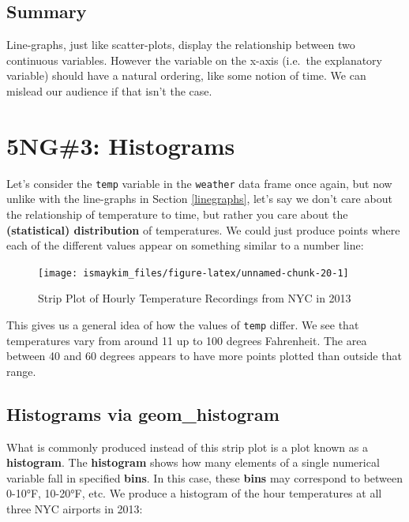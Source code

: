 \documentclass[]{tufte-book}
\begin{document}
\subsection{Summary}\label{summary-1}

Line-graphs, just like scatter-plots, display the relationship between
two continuous variables. However the variable on the x-axis (i.e.~the
explanatory variable) should have a natural ordering, like some notion
of time. We can mislead our audience if that isn't the case.

\section{5NG\#3: Histograms}\label{histograms}

Let's consider the \texttt{temp} variable in the \texttt{weather} data
frame once again, but now unlike with the line-graphs in Section
\ref{linegraphs}, let's say we don't care about the relationship of
temperature to time, but rather you care about the \textbf{(statistical)
distribution} of temperatures. We could just produce points where each
of the different values appear on something similar to a number line:

\begin{figure}

{\centering \texttt{[image: ismaykim\_files/figure-latex/unnamed-chunk-20-1]} 

}

\caption[Strip Plot of Hourly Temperature Recordings from NYC in 2013]{Strip Plot of Hourly Temperature Recordings from NYC in 2013}\label{fig:unnamed-chunk-20}
\end{figure}

This gives us a general idea of how the values of \texttt{temp} differ.
We see that temperatures vary from around 11 up to 100 degrees
Fahrenheit. The area between 40 and 60 degrees appears to have more
points plotted than outside that range.

\subsection{Histograms via geom\_histogram}\label{geomhistogram}

What is commonly produced instead of this strip plot is a plot known as
a \textbf{histogram}. The \textbf{histogram} shows how many elements of
a single numerical variable fall in specified \textbf{bins}. In this
case, these \textbf{bins} may correspond to between 0-10°F, 10-20°F,
etc. We produce a histogram of the hour temperatures at all three NYC
airports in 2013:
\end{document}
